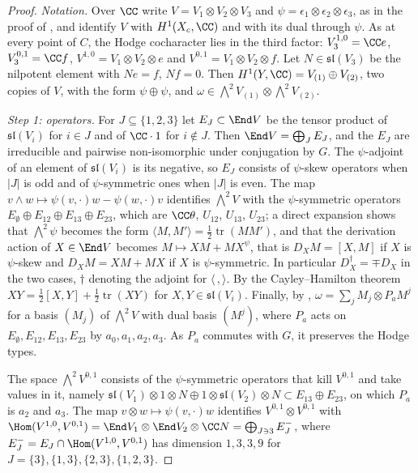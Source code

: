 \begin{proof}
\emph{Notation.} Over $\CC$ write $V=V_{1}\otimes V_{2}\otimes V_{3}$ and
$\psi=\epsilon_{1}\otimes\epsilon_{2}\otimes\epsilon_{3}$, as in the proof of
, and identify $V$ with $H^{1}(X_{c},\CC)$ and with its
dual through $\psi$. As at every point of $C$, the Hodge cocharacter lies in
the third factor: $V_{3}^{1,0}=\CC e$, $V_{3}^{0,1}=\CC f$, $V^{1,0}=V_{1}
\otimes V_{2}\otimes e$ and $V^{0,1}=V_{1}\otimes V_{2}\otimes f$. Let
$N\in\mathfrak{sl}(V_{3})$ be the nilpotent element with $Ne=f$, $Nf=0$. Then
$H^{1}(Y,\CC)=V_{(1)}\oplus V_{(2)}$, two copies of $V$, with the form
$\psi\oplus\psi$, and $\omega\in{\textstyle\bigwedge^{2}}V_{(1)}\otimes
{\textstyle\bigwedge^{2}}V_{(2)}$.

\emph{Step 1: operators.} For $J\subseteq\{1,2,3\}$ let $E_{J}\subset\End V$
be the tensor product of $\mathfrak{sl}(V_{i})$ for $i\in J$ and of $\CC\cdot1$
for $i\notin J$. Then $\End V=\bigoplus_{J}E_{J}$, and the $E_{J}$ are
irreducible and pairwise non-isomorphic under conjugation by $G$. The
$\psi$-adjoint of an element of $\mathfrak{sl}(V_{i})$ is its negative, so
$E_{J}$ consists of $\psi$-skew operators when $|J|$ is odd and of
$\psi$-symmetric ones when $|J|$ is even. The map $v\wedge w\mapsto
\psi(v,\cdot)w-\psi(w,\cdot)v$ identifies ${\textstyle\bigwedge^{2}}V$ with the
$\psi$-symmetric operators $E_{\emptyset}\oplus E_{12}\oplus E_{13}\oplus
E_{23}$, which are $\CC\theta$, $U_{12}$, $U_{13}$, $U_{23}$; a direct
expansion shows that ${\textstyle\bigwedge^{2}}\psi$ becomes the form
$\langle M,M'\rangle=\frac12\operatorname{tr}(MM')$, and that the derivation
action of $X\in\End V$ becomes $M\mapsto XM+MX^{\psi}$, that is
$D_{X}M=[X,M]$ if $X$ is $\psi$-skew and $D_{X}M=XM+MX$ if $X$ is
$\psi$-symmetric. In particular $D_{X}^{\dagger}=\mp D_{X}$ in the two cases,
$\dagger$ denoting the adjoint for $\langle\,,\rangle$. By the Cayley--Hamilton
theorem $XY=\frac12[X,Y]+\frac12\operatorname{tr}(XY)$ for
$X,Y\in\mathfrak{sl}(V_{i})$. Finally, by ,
$\omega=\sum_{j}M_{j}\otimes P_{a}M^{j}$ for a basis $(M_{j})$ of
${\textstyle\bigwedge^{2}}V$ with dual basis $(M^{j})$, where $P_{a}$ acts on
$E_{\emptyset},E_{12},E_{13},E_{23}$ by $a_{0},a_{1},a_{2},a_{3}$. As $P_{a}$
commutes with $G$, it preserves the Hodge types.

The space ${\textstyle\bigwedge^{2}}V^{0,1}$ consists of the $\psi$-symmetric
operators that kill $V^{0,1}$ and take values in it, namely
$\mathfrak{sl}(V_{1})\otimes1\otimes N\oplus1\otimes\mathfrak{sl}(V_{2})
\otimes N\subset E_{13}\oplus E_{23}$, on which $P_{a}$ is $a_{2}$ and $a_{3}$.
The map $v\otimes w\mapsto\psi(v,\cdot)w$ identifies $V^{0,1}\otimes V^{0,1}$
with $\Hom(V^{1,0},V^{0,1})=\End V_{1}\otimes\End V_{2}\otimes\CC N=
\bigoplus_{J\ni3}E_{J}^{-}$, where $E_{J}^{-}=E_{J}\cap\Hom(V^{1,0},V^{0,1})$
has dimension $1,3,3,9$ for $J=\{3\},\{1,3\},\{2,3\},\{1,2,3\}$.


\end{proof}
